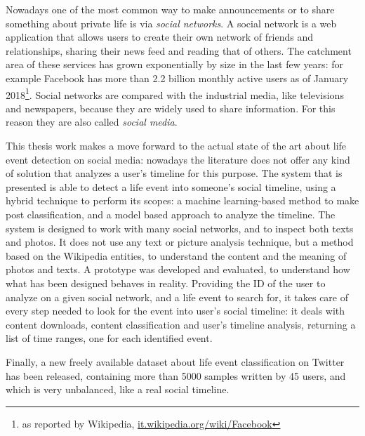 Nowadays one of the most common way to make announcements or to share something about private life is via \emph{social networks}. A social network is a web application that allows users to create their own network of friends and relationships, sharing their news feed and reading that of others. The 
catchment area of these services has grown exponentially by size in the last few years: for example Facebook has more than 2.2 billion monthly active users as of January 2018\footnote{as reported by Wikipedia, \url{it.wikipedia.org/wiki/Facebook}}. Social networks are compared with the industrial media, like televisions and newspapers, because they are widely used to share information. For this reason they are also called \emph{social media}.

This thesis work makes a move forward to the actual state of the art about life event detection on social media: nowadays the literature does not offer any kind of solution that analyzes a user's timeline for this purpose. The system that is presented is able to detect a life event into someone's social timeline, using a hybrid technique to perform its scopes: a machine learning-based method to make post classification, and a model based approach to analyze the timeline. The system is designed to work with many social networks, and to inspect both texts and photos. It does not use any text or picture analysis technique, but a method based on the Wikipedia entities, to understand the content and the meaning of photos and texts. A prototype was developed and evaluated, to understand how what has been designed behaves in reality. Providing the ID of the user to analyze on a given social network, and a life event to search for, it takes care of every step needed to look for the event into user's social timeline: it deals with content downloads, content classification and user's timeline analysis, returning a list of time ranges, one for each identified event.

Finally, a new freely available dataset about life event classification on Twitter has been released, containing more than 5000 samples written by 45 users, and which is very unbalanced, like a real social timeline.

